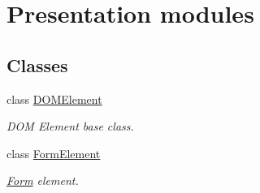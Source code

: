 \hypertarget{group__OWL__UI__LAYER}{
\section{Presentation modules}
\label{group__OWL__UI__LAYER}
}
\subsection*{Classes}
\begin{CompactItemize}
\item 
class \hyperlink{classDOMElement}{DOMElement}
\begin{CompactList}\small\item\em DOM Element base class. \item\end{CompactList}\item 
class \hyperlink{classFormElement}{FormElement}
\begin{CompactList}\small\item\em \hyperlink{classForm}{Form} element. \item\end{CompactList}\end{CompactItemize}
